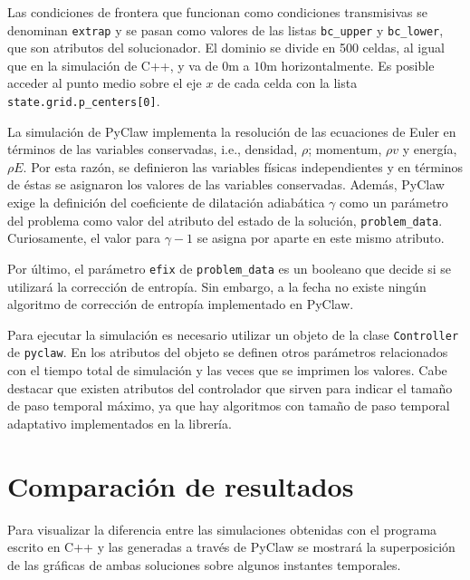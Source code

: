 
Las condiciones de frontera que funcionan como condiciones transmisivas se denominan \texttt{extrap} y se pasan como valores de las listas \texttt{bc\_upper} y \texttt{bc\_lower}, que son atributos del solucionador. El dominio se divide en 500 celdas, al igual que en la simulación de C++, y va de $0\unit{\m}$ a $10\unit{\m}$ horizontalmente. Es posible acceder al punto medio sobre el eje $x$ de cada celda con la lista \texttt{state.grid.p\_centers[0]}.


La simulación de PyClaw implementa la resolución de las ecuaciones de Euler en términos de las variables conservadas, i.e., densidad, $\rho$; momentum, $\rho v$ y energía, $\rho E$. Por esta razón, se definieron  las variables físicas independientes y en términos de éstas se asignaron los valores de las variables conservadas. Además, PyClaw exige la definición del coeficiente de dilatación adiabática $\gamma$ como un parámetro del problema como valor del atributo del estado de la solución, \texttt{problem\_data}. Curiosamente, el valor para $\gamma -1$ se asigna por aparte en este mismo atributo.

Por último, el parámetro \texttt{efix} de \texttt{problem\_data} es un booleano que decide si se utilizará la corrección de entropía. Sin embargo, a la fecha no existe ningún algoritmo de corrección de entropía implementado en PyClaw.


Para ejecutar la simulación es necesario utilizar un objeto de la clase \texttt{Controller} de \texttt{pyclaw}. En los atributos del objeto se definen otros parámetros relacionados con el tiempo total de simulación y las veces que se imprimen los valores. Cabe destacar que existen atributos del controlador que sirven para indicar el tamaño de paso temporal máximo, ya que hay algoritmos con tamaño de paso temporal adaptativo implementados en la librería.

\section{Comparación de resultados}
Para visualizar la diferencia entre las simulaciones obtenidas con el programa escrito en C++ y las generadas a través de PyClaw se mostrará la superposición de las gráficas de ambas soluciones sobre algunos instantes temporales. 

